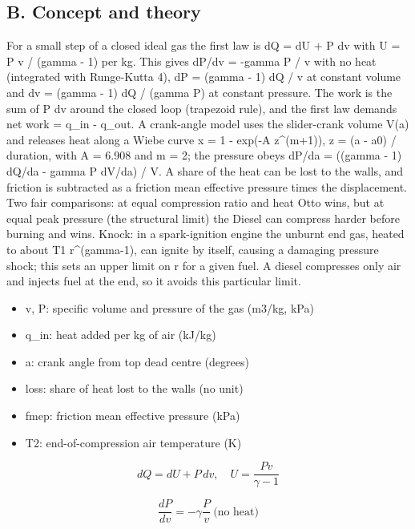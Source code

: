 \documentclass[11pt,a4paper]{article}
\begin{document}
\subsection*{B. Concept and theory}
For a small step of a closed ideal gas the first law is dQ = dU + P dv with U = P v / (gamma - 1) per kg. This gives dP/dv = -gamma P / v with no heat (integrated with Runge-Kutta 4), dP = (gamma - 1) dQ / v at constant volume and dv = (gamma - 1) dQ / (gamma P) at constant pressure. The work is the sum of P dv around the closed loop (trapezoid rule), and the first law demands net work = q\_in - q\_out. A crank-angle model uses the slider-crank volume V(a) and releases heat along a Wiebe curve x = 1 - exp(-A z\textasciicircum{}(m+1)), z = (a - a0) / duration, with A = 6.908 and m = 2; the pressure obeys dP/da = ((gamma - 1) dQ/da - gamma P dV/da) / V. A share of the heat can be lost to the walls, and friction is subtracted as a friction mean effective pressure times the displacement. Two fair comparisons: at equal compression ratio and heat Otto wins, but at equal peak pressure (the structural limit) the Diesel can compress harder before burning and wins. Knock: in a spark-ignition engine the unburnt end gas, heated to about T1 r\textasciicircum{}(gamma-1), can ignite by itself, causing a damaging pressure shock; this sets an upper limit on r for a given fuel. A diesel compresses only air and injects fuel at the end, so it avoids this particular limit.

\begin{itemize}[nosep]
\item v, P: specific volume and pressure of the gas (m3/kg, kPa)
\item q\_in: heat added per kg of air (kJ/kg)
\item a: crank angle from top dead centre (degrees)
\item loss: share of heat lost to the walls (no unit)
\item fmep: friction mean effective pressure (kPa)
\item T2: end-of-compression air temperature (K)
\end{itemize}

\begin{equation*}
dQ = dU + P\,dv,\quad U = \frac{P v}{\gamma-1}
\end{equation*}

\begin{equation*}
\frac{dP}{dv} = -\gamma\frac{P}{v}\ \text{(no heat)}
\end{equation*}
\end{document}
